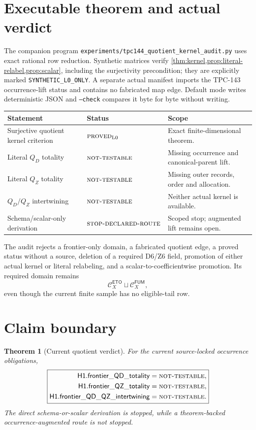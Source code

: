 \documentclass[11pt]{article}
\newtheorem{theorem}{Theorem}[section]
\theoremstyle{definition}
\theoremstyle{remark}
\newcommand{\NT}{\textnormal{\textsc{not-testable}}}
\newcommand{\PROVED}{\textnormal{\textsc{proved}}}
\newcommand{\STOP}{\textnormal{\textsc{stop-declared-route}}}
\newcommand{\Lzero}{\mathrm{L0}}
\begin{document}
\section{Executable theorem and actual verdict}

The companion program
\texttt{experiments/tpc144\_quotient\_kernel\_audit.py} uses exact
rational row reduction.  Synthetic matrices verify
\cref{thm:kernel,prop:literal-relabel,prop:scalar}, including the
surjectivity precondition; they are explicitly marked
\texttt{SYNTHETIC\_L0\_ONLY}.  A separate actual manifest imports the
TPC-143 occurrence-lift status and contains no fabricated map edge.
Default mode writes deterministic JSON and \texttt{--check} compares
it byte for byte without writing.

\begin{center}
\small
\begin{tabularx}{\textwidth}{@{}P{0.36\textwidth}P{0.24\textwidth}Y@{}}
\toprule
Statement & Status & Scope\\
\midrule
Surjective quotient kernel criterion
& \(\PROVED_{\Lzero}\) & Exact finite-dimensional theorem.\\
Literal \(Q_D\) totality
& \(\NT\) & Missing occurrence and canonical-parent lift.\\
Literal \(Q_Z\) totality
& \(\NT\) & Missing outer records, order and allocation.\\
\(Q_D/Q_Z\) intertwining
& \(\NT\) & Neither actual kernel is available.\\
Schema/scalar-only derivation
& \(\STOP\) & Scoped stop; augmented lift remains open.\\
\bottomrule
\end{tabularx}
\end{center}

The audit rejects a frontier-only domain, a fabricated quotient edge,
a proved status without a source, deletion of a required D6/Z6 field,
promotion of either actual kernel or literal relabeling, and a
scalar-to-coefficientwise promotion.  Its required domain remains
\[
 \mathcal C_X^{\mathsf{ETO}}\sqcup
 \mathcal C_X^{\mathsf{FUM}},
\]
even though the current finite sample has no eligible-tail row.

\section{Claim boundary}

\begin{theorem}[Current quotient verdict]
For the current source-locked occurrence obligations,
\[
\boxed{
\begin{aligned}
\mathsf{H1.frontier\_QD\_totality}&=\NT,\\
\mathsf{H1.frontier\_QZ\_totality}&=\NT,\\
\mathsf{H1.frontier\_QD\_QZ\_intertwining}&=\NT.
\end{aligned}}
\]
The direct schema-or-scalar derivation is stopped, while a
theorem-backed occurrence-augmented route is not stopped.
\end{theorem}
\end{document}
